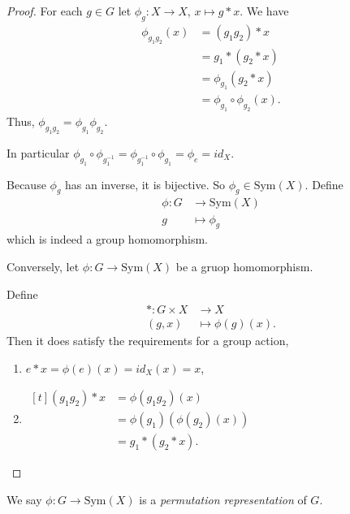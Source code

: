 \begin{proof}
    For each \(g \in G\) let \(\phi_g: X \to X\), \(x \mapsto g* x\). We have
    \begin{align*}
        \phi_{g_1 g_2}(x) &= (g_1 g_2)*x\\
        &= g_1*(g_2*x)\\
        &= \phi_{g_1}(g_2 * x)\\
        &= \phi_{g_1}\circ\phi_{g_2}(x).
    \end{align*}
    Thus, \(\phi_{g_1 g_2} = \phi_{g_1} \phi_{g_2}\).
    
    In particular \(\phi_{g_1} \circ \phi_{g_1^{-1}} = \phi_{g_1^{-1}} \circ \phi_{g_1} = \phi_e = id_X\).

    Because \(\phi_g\) has an inverse, it is bijective. So \(\phi_g \in \mathrm{Sym}(X)\).
    Define
    \begin{equation*}
    \begin{aligned}
    \phi\colon G & \longrightarrow \mathrm{Sym}(X)      \\
    g          & \longmapsto \phi_g
    \end{aligned}
    \end{equation*}
    which is indeed a group homomorphism.

    Conversely, let \(\phi: G \to \mathrm{Sym}(X)\) be a gruop homomorphism.

    Define
    \begin{equation*}
    \begin{aligned}
      *\colon G\times X & \longrightarrow X      \\
                (g,x)&\longmapsto \phi(g)(x).
    \end{aligned}
    \end{equation*}
    Then it does satisfy the requirements for a group action,
    \begin{enumerate}
        \item \(e*x = \phi(e)(x) = id_X(x) = x\),
        \item
        \(\begin{aligned}[t]
        (g_1 g_2) * x &= \phi(g_1 g_2)(x)\\
        &= \phi(g_1)(\phi(g_2)(x))\\
        &=g_1 * (g_2 * x).
        \end{aligned}\)
    \end{enumerate}
\end{proof}
\begin{definition}
    We say \(\phi: G \to \mathrm{Sym}(X)\) is a \textit{permutation representation} of \(G\).
\end{definition}
